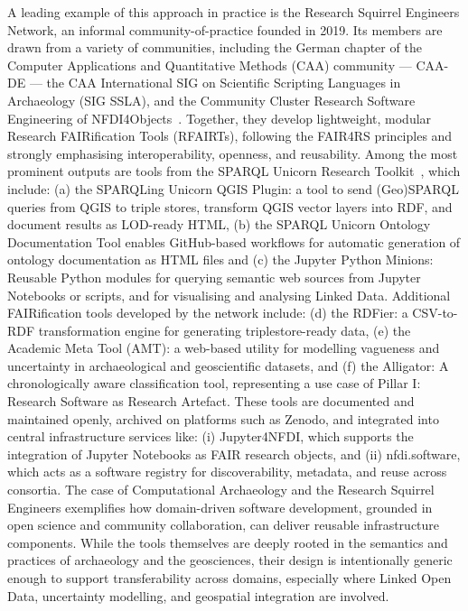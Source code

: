 \documentclass{eceasst}
\begin{document}
A leading example of this approach in practice is the Research Squirrel Engineers Network, an informal community-of-practice founded in 2019. Its members are drawn from a variety of communities, including the German chapter of the Computer Applications and Quantitative Methods (CAA) community — CAA-DE — the CAA International SIG on Scientific Scripting Languages in Archaeology (SIG SSLA), and the Community Cluster Research Software Engineering of NFDI4Objects~\cite{thiery_digitale_2025,von_rummel_nfdi4objects_2025}. Together, they develop lightweight, modular Research FAIRification Tools (RFAIRTs), following the FAIR4RS principles and strongly emphasising interoperability, openness, and reusability. Among the most prominent outputs are tools from the SPARQL Unicorn Research Toolkit~\cite{thiery_research_2025}, which include: (a) the SPARQLing Unicorn QGIS Plugin: a tool to send (Geo)SPARQL queries from QGIS to triple stores, transform QGIS vector layers into RDF, and document results as LOD-ready HTML, (b) the SPARQL Unicorn Ontology Documentation Tool enables GitHub-based workflows for automatic generation of ontology documentation as HTML files and (c) the Jupyter Python Minions: Reusable Python modules for querying semantic web sources from Jupyter Notebooks or scripts, and for visualising and analysing Linked Data. Additional FAIRification tools developed by the network include: (d) the RDFier: a CSV-to-RDF transformation engine for generating triplestore-ready data, (e) the Academic Meta Tool (AMT): a web-based utility for modelling vagueness and uncertainty in archaeological and geoscientific datasets, and (f) the Alligator: A chronologically aware classification tool, representing a use case of Pillar I: Research Software as Research Artefact. These tools are documented and maintained openly, archived on platforms such as Zenodo, and integrated into central infrastructure services like: (i) Jupyter4NFDI, which supports the integration of Jupyter Notebooks as FAIR research objects, and (ii) nfdi.software, which acts as a software registry for discoverability, metadata, and reuse across consortia. The case of Computational Archaeology and the Research Squirrel Engineers exemplifies how domain-driven software development, grounded in open science and community collaboration, can deliver reusable infrastructure components. While the tools themselves are deeply rooted in the semantics and practices of archaeology and the geosciences, their design is intentionally generic enough to support transferability across domains, especially where Linked Open Data, uncertainty modelling, and geospatial integration are involved.
\end{document}
